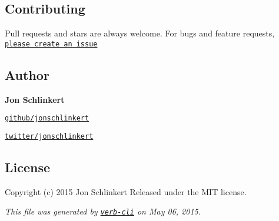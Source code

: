 \subsection*{Contributing}

Pull requests and stars are always welcome. For bugs and feature requests, \href{https://github.com/jonschlinkert/repeat-element/issues}{\tt please create an issue}

\subsection*{Author}

{\bfseries Jon Schlinkert}


\begin{DoxyItemize}
\item \href{https://github.com/jonschlinkert}{\tt github/jonschlinkert}
\item \href{http://twitter.com/jonschlinkert}{\tt twitter/jonschlinkert}
\end{DoxyItemize}

\subsection*{License}

Copyright (c) 2015 Jon Schlinkert Released under the M\+IT license.





{\itshape This file was generated by \href{https://github.com/assemble/verb-cli}{\tt verb-\/cli} on May 06, 2015.} 